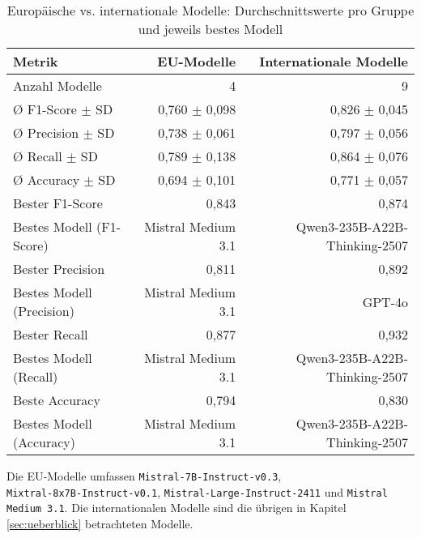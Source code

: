 \begin{table}[htbp]
 \centering
 \caption{Europäische vs. internationale Modelle: Durchschnittswerte pro Gruppe und jeweils bestes Modell}
 \label{tab:eu-vs-international}
 \begin{adjustbox}{width=\textwidth}
  \begin{threeparttable}[width=\textwidth]
   \begin{tabular}[width=\textwidth]{l r r}
    \toprule
    \textbf{Metrik} & \textbf{\ac{EU}-Modelle} & \textbf{Internationale Modelle} \\
    \midrule
    Anzahl Modelle              & 4                           & 9 \\
    Ø F1-Score $\pm$ SD         & 0{,}760 $\pm$ 0{,}098       & 0{,}826 $\pm$ 0{,}045 \\
    Ø Precision $\pm$ SD        & 0{,}738 $\pm$ 0{,}061       & 0{,}797 $\pm$ 0{,}056 \\
    Ø Recall $\pm$ SD           & 0{,}789 $\pm$ 0{,}138       & 0{,}864 $\pm$ 0{,}076 \\
    Ø Accuracy $\pm$ SD         & 0{,}694 $\pm$ 0{,}101       & 0{,}771 $\pm$ 0{,}057 \\
    Bester F1-Score             & 0{,}843                     & 0{,}874 \\
    Bestes Modell (F1-Score)    & Mistral Medium 3.1          & Qwen3-235B-A22B-Thinking-2507 \\
    Bester Precision            & 0{,}811                     & 0{,}892 \\
    Bestes Modell (Precision)   & Mistral Medium 3.1          & GPT-4o \\
    Bester Recall               & 0{,}877                     & 0{,}932 \\
    Bestes Modell (Recall)      & Mistral Medium 3.1          & Qwen3-235B-A22B-Thinking-2507 \\
    Beste Accuracy              & 0{,}794                     & 0{,}830 \\
    Bestes Modell (Accuracy)    & Mistral Medium 3.1          & Qwen3-235B-A22B-Thinking-2507 \\
    \bottomrule
   \end{tabular}
   \begin{tablenotes}
    \footnotesize
    \item Die \ac{EU}‑Modelle umfassen \texttt{Mistral‑7B‑Instruct‑v0.3}, \texttt{Mixtral‑8x7B‑Instruct‑v0.1}, \texttt{Mistral‑Large‑Instruct‑2411} und \texttt{Mistral Medium 3.1}. Die internationalen Modelle sind die übrigen in Kapitel \ref{sec:ueberblick} betrachteten Modelle.
   \end{tablenotes}
  \end{threeparttable}
 \end{adjustbox}
\end{table}

